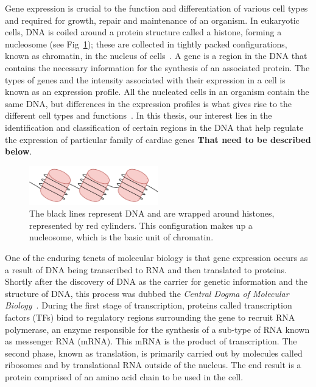         Gene expression is crucial to the function and differentiation of various cell types and required for growth, repair and maintenance of an organism.  In eukaryotic cells, DNA is coiled around a protein structure called a histone, forming a nucleosome (see Fig~\ref{fig:chromatin1}); these are collected in tightly packed configurations, known as chromatin, in the nucleus of cells~\cite{alberts2002chromosomal, kornberg1974chromatin}. A gene is a region in the DNA that contains the necessary information for the synthesis of an associated protein. The types of genes and the intensity associated with their expression in a cell is known as an expression profile. All the nucleated cells in an organism contain the same DNA, but differences in the expression profiles is what gives rise to the different cell types and functions~\cite{lockhart2000genomics}. In this thesis, our interest lies in the identification and classification of certain regions in the DNA that help regulate the expression of particular family of cardiac genes \textbf{That need to be described below}. 

        
            \begin{figure}[H]
                 \centering
            \includegraphics[width=0.5\textwidth]{Chromatin.pdf}
                \caption{The black lines represent DNA and are wrapped around histones, represented by red cylinders. This configuration makes up a nucleosome, which is the basic unit of chromatin.}
                \label{fig:chromatin1}
            \end{figure}
            

        
        
        One of the enduring tenets of molecular biology is that gene expression occurs as a result of DNA being transcribed to RNA and then translated to proteins. Shortly after the discovery of DNA as the carrier for genetic information and the structure of DNA, this process was dubbed the \emph{Central Dogma of Molecular Biology}~\cite{crick1958protein, macleod1944studies, watson1953structure}. During the first stage of transcription, proteins called transcription factors (TFs) bind to regulatory regions surrounding the gene to recruit RNA polymerase, an enzyme responsible for the synthesis of a sub-type of RNA known as messenger RNA (mRNA). This mRNA is the product of transcription. The second phase, known as translation, is primarily carried out by molecules called ribosomes and by translational RNA outside of the nucleus. The end result is a protein comprised of an amino acid chain to be used in the cell.
        
